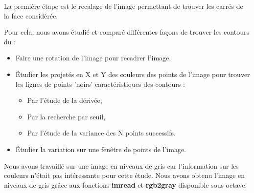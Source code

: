   La première étape est le recalage de l'image permettant de trouver les carrés de la face considérée. 

  Pour cela, nous avons étudié et comparé différentes façons de trouver les contours du \rubic{} : 
\begin{itemize}
  \item Faire une rotation de l'image pour recadrer l'image, 
  \item Étudier les projetés en X et Y des couleurs des points de l'image pour trouver les lignes de points 'noirs' caractéristiques des 
contours : 
    \begin{itemize}
      \item Par l'étude de la dérivée, 
      \item Par la recherche par seuil, 
      \item Par l'étude de la variance des N points successifs. 
    \end{itemize}
  \item Étudier la variation sur une fenêtre de points de l'image. 
\end{itemize}

  Nous avons travaillé sur une image en niveaux de gris car l'information sur les couleurs n'était pas intéressante pour cette étude. 
Nous avons obtenu l'image en niveaux de gris grâce aux fonctions \textbf{imread} et \textbf{rgb2gray} disponible sous octave. 
